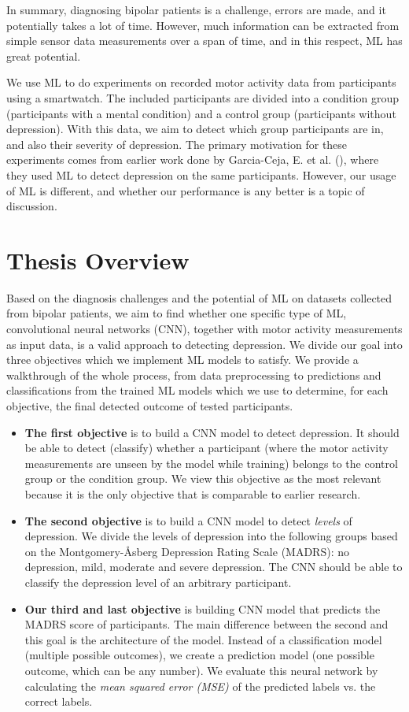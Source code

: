 In summary, diagnosing bipolar patients is a challenge, errors are made, and it potentially takes a lot of time. However, much information can be extracted from simple sensor data measurements over a span of time, and in this respect, ML has great potential. 

We use ML to do experiments on recorded motor activity data from participants using a smartwatch. The included participants are divided into a condition group (participants with a mental condition) and a control group (participants without depression). With this data, we aim to detect which group participants are in, and also their severity of depression. The primary motivation for these experiments comes from earlier work done by Garcia-Ceja, E. et al. (\cite{GarciaCeja2018_classification_bipolar}), where they used ML to detect depression on the same participants. However, our usage of ML is different, and whether our performance is any better is a topic of discussion.

\section{Thesis Overview}
Based on the diagnosis challenges and the potential of ML on datasets collected from bipolar patients, we aim to find whether one specific type of ML, convolutional neural networks (CNN), together with motor activity measurements as input data, is a valid approach to detecting depression. We divide our goal into three objectives which we implement ML models to satisfy. We provide a walkthrough of the whole process, from data preprocessing to predictions and classifications from the trained ML models which we use to determine, for each objective, the final detected outcome of tested participants.

\begin{itemize}
    \item \textbf{The first objective} is to build a CNN model to detect depression. It should be able to detect (classify) whether a participant (where the motor activity measurements are unseen by the model while training) belongs to the control group or the condition group. We view this objective as the most relevant because it is the only objective that is comparable to earlier research.
    \item \textbf{The second objective} is to build a CNN model to detect \textit{levels} of depression. We divide the levels of depression into the following groups based on the Montgomery-Åsberg Depression Rating Scale (MADRS): no depression, mild, moderate and severe depression. The CNN should be able to classify the depression level of an arbitrary participant.
    \item \textbf{Our third and last objective} is building CNN model that predicts the MADRS score of participants. The main difference between the second and this goal is the architecture of the model. Instead of a classification model (multiple possible outcomes), we create a prediction model (one possible outcome, which can be any number). We evaluate this neural network by calculating the \textit{mean squared error (MSE)} of the predicted labels vs. the correct labels.
\end{itemize}

